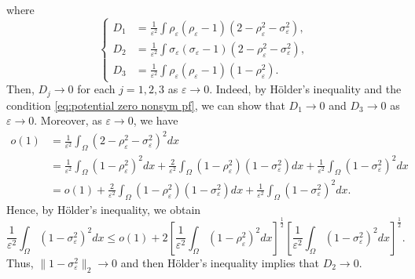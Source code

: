 \documentclass[a4paper,10pt,reqno]{amsart}
\theoremstyle{definition}
\newcommand{\ve}{{\varepsilon}}
\newcommand{\Om}{{\Omega}}
\numberwithin{equation}{section}
\begin{document}
 where
 \begin{equation}\label{eq:D123}
 \left\{
 \begin{aligned}
 D_1 & =  \frac{1}{\varepsilon^2} \int \rho_\varepsilon (\rho_\varepsilon - 1)(2 - \rho_\varepsilon^2 -  \sigma_\varepsilon^2),\\
 D_2 & =  \frac{1}{\varepsilon^2} \int \sigma_\varepsilon (\sigma_\varepsilon - 1)(2 - \rho_\varepsilon^2 -   \sigma_\varepsilon^2),\\
  D_3& =  \frac{1}{\varepsilon^2} \int \rho_\varepsilon (\rho_\varepsilon - 1)(1 - \rho_\varepsilon^2).
 \end{aligned}\right.
 \end{equation}
 Then, $D_j\to 0$ for each $j=1,2,3$ as $\ve \to0$.
 Indeed,  by H\"{o}lder's inequality and the condition \eqref{eq:potential zero nonsym pf}, we can show that $D_1 \to 0$ and $D_3 \to 0$ as $\ve \to 0$.
 Moreover, as $\ve \to 0$, we have
\begin{align*}
o(1)&= \frac{1}{\varepsilon^2}  \int_\Om (2 - \rho_\varepsilon^2 -  \sigma_\varepsilon^2)^2 dx\\
&= \frac{1}{\varepsilon^2}\int_\Om  (1 - \rho_\varepsilon^2)^2 dx +  \frac{2}{\varepsilon^2}\int_\Om  (1 - \rho_\varepsilon^2)(1 - \sigma_\varepsilon^2) dx +  \frac{1}{\varepsilon^2}\int_\Om  (1 - \sigma_\varepsilon^2)^2 dx \\
& =o(1) +  \frac{2}{\varepsilon^2}\int_\Om  (1 - \rho_\varepsilon^2)(1 - \sigma_\varepsilon^2) dx +  \frac{1}{\varepsilon^2}\int_\Om  (1 - \sigma_\varepsilon^2)^2 dx.
\end{align*}
Hence, by H\"{o}lder's inequality, we obtain
\[  \frac{1}{\varepsilon^2}\int_\Om  (1 - \sigma_\varepsilon^2)^2 dx \le o(1)+
2 \left[ \frac{1}{\varepsilon^2}\int_\Om  (1 - \rho_\varepsilon^2)^2 dx \right]^{\frac12}
 \left[ \frac{1}{\varepsilon^2}\int_\Om  (1 - \sigma_\varepsilon^2)^2 dx \right]^{\frac12}.
\]
Thus, $\|1-\sigma_\ve^2 \|_2\to 0$ and  then H\"{o}lder's inequality implies that $D_2 \to 0$.
\end{document}
